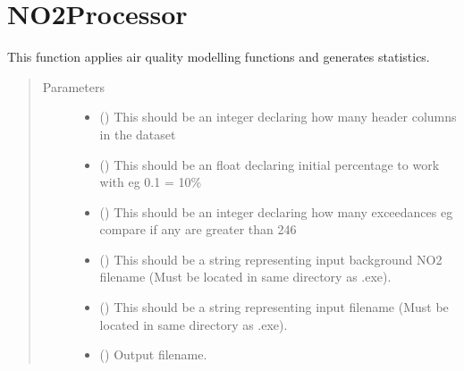 \documentclass[letterpaper,10pt,english,openany,oneside]{sphinxmanual}
\begin{document}
\chapter{NO2Processor}
\label{\detokenize{index:module-NO2Processor}}\label{\detokenize{index:no2processor}}

\begin{fulllineitems}
\label{\detokenize{index:NO2Processor.process}}
This function applies air quality modelling functions and generates statistics.
\begin{quote}\begin{description}
\item[{Parameters}] \leavevmode\begin{itemize}
\item {} 
 () \textendash{} This should be an integer declaring how many header columns in the dataset

\item {} 
 () \textendash{} This should be an float declaring initial percentage to work with eg 0.1 = 10\%

\item {} 
 () \textendash{} This should be an integer declaring how many exceedances eg compare if any are greater than 246

\item {} 
 () \textendash{} This should be a string representing input background NO2 filename (Must be located in same directory as .exe).

\item {} 
 () \textendash{} This should be a string representing input filename (Must be located in same directory as .exe).

\item {} 
 () \textendash{} Output filename.

\end{itemize}

\end{description}\end{quote}

\end{fulllineitems}
\end{document}

